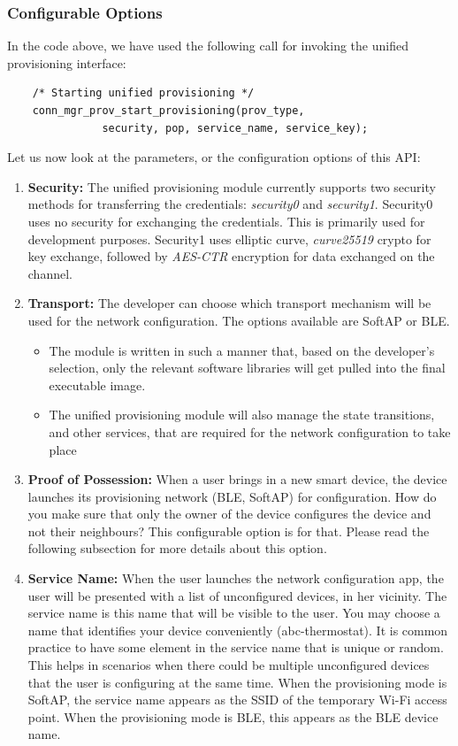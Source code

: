 \documentclass[main.tex]{subfiles}
\begin{document}
\subsubsection{Configurable Options}
In the code above, we have used the following call for invoking the unified provisioning interface:
\begin{verbatim}
    /* Starting unified provisioning */
    conn_mgr_prov_start_provisioning(prov_type,
               security, pop, service_name, service_key);
\end{verbatim}

Let us now look at the parameters, or the configuration options of this API:
\begin{enumerate}
    \item \textbf{Security:} The unified provisioning module currently supports two security methods for transferring the credentials: \textit{security0} and \textit{security1}. Security0 uses no security for exchanging the credentials. This is primarily used for development purposes. Security1 uses elliptic curve, \textit{curve25519} crypto for key exchange, followed by \textit{AES-CTR} encryption for data exchanged on the channel.
    \item \textbf{Transport:} The developer can choose which transport mechanism will be used for the network configuration. The options available are SoftAP or BLE. 
    \begin{itemize}
        \item The module is written in such a manner that, based on the developer's selection, only the relevant software libraries will get pulled into the final executable image. 
        \item The unified provisioning module will also manage the state transitions, and other services, that are required for the network configuration to take place
    \end{itemize}
    \item \textbf{Proof of Possession:} When a user brings in a new smart device, the device launches its provisioning network (BLE, SoftAP) for configuration.  How do you make sure that only the owner of the device configures the device and not their neighbours? This configurable option is for that. Please read the following subsection for more details about this option.
    \item \textbf{Service Name:} When the user launches the network configuration app, the user will be presented with a list of unconfigured devices, in her vicinity. The service name is this name that will be visible to the user. You may choose a name that identifies your device conveniently (abc-thermostat). It is common practice to have some element in the service name that is unique or random. This helps in scenarios when there could be multiple unconfigured devices that the user is configuring at the same time. When the provisioning mode is SoftAP, the service name appears as the SSID of the temporary Wi-Fi access point. When the provisioning mode is BLE, this appears as the BLE device name.

\end{enumerate}
\end{document}
